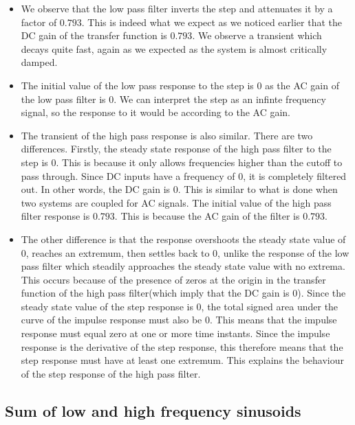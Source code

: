 \documentclass[11pt]{article}
\providecommand{\tightlist}{%
      \setlength{\itemsep}{0pt}\setlength{\parskip}{0pt}}
\begin{document}
    \begin{itemize}
\tightlist
\item
  We observe that the low pass filter inverts the step and attenuates it
  by a factor of \(0.793\). This is indeed what we expect as we noticed
  earlier that the DC gain of the transfer function is \(0.793\). We
  observe a transient which decays quite fast, again as we expected as
  the system is almost critically damped.
\item
  The initial value of the low pass response to the step is \(0\) as the
  AC gain of the low pass filter is \(0\). We can interpret the step as
  an infinte frequency signal, so the response to it would be according
  to the AC gain.
\item
  The transient of the high pass response is also similar. There are two
  differences. Firstly, the steady state response of the high pass
  filter to the step is \(0\). This is because it only allows
  frequencies higher than the cutoff to pass through. Since DC inputs
  have a frequency of \(0\), it is completely filtered out. In other
  words, the DC gain is \(0\). This is similar to what is done when two
  systems are coupled for AC signals. The initial value of the high pass
  filter response is \(0.793\). This is because the AC gain of the
  filter is \(0.793\).
\item
  The other difference is that the response overshoots the steady state
  value of \(0\), reaches an extremum, then settles back to \(0\),
  unlike the response of the low pass filter which steadily approaches
  the steady state value with no extrema. This occurs because of the
  presence of zeros at the origin in the transfer function of the high
  pass filter(which imply that the DC gain is \(0\)). Since the steady
  state value of the step response is \(0\), the total signed area under
  the curve of the impulse response must also be \(0\). This means that
  the impulse response must equal zero at one or more time instants.
  Since the impulse response is the derivative of the step response,
  this therefore means that the step response must have at least one
  extremum. This explains the behaviour of the step response of the high
  pass filter.
\end{itemize}

	

	
		
    \subsection{Sum of low and high frequency
sinusoids}\label{sum-of-low-and-high-frequency-sinusoids}
\end{document}
